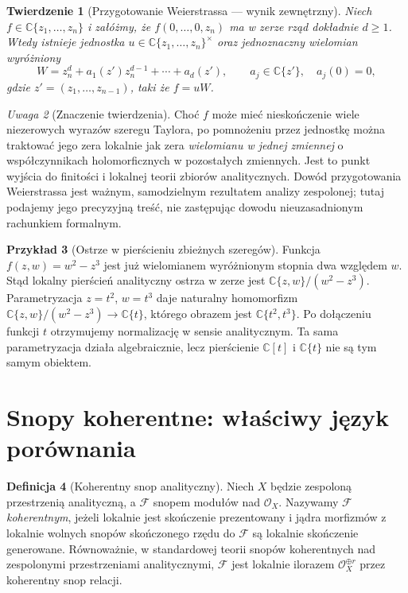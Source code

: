 \documentclass[11pt,a4paper,openany]{report}
\numberwithin{equation}{section}
\theoremstyle{plain}
\newtheorem{twierdzenie}{Twierdzenie}[section]
\theoremstyle{definition}
\newtheorem{definicja}[twierdzenie]{Definicja}
\newtheorem{przyklad}[twierdzenie]{Przykład}
\theoremstyle{remark}
\newtheorem{uwaga}[twierdzenie]{Uwaga}
\newcommand{\C}{\mathbb C}
\begin{document}
\begin{twierdzenie}[Przygotowanie Weierstrassa — wynik zewnętrzny]
\label{tw:ga9-weierstrass}
Niech $f\in\C\{z_1,\ldots,z_n\}$ i załóżmy, że
$f(0,\ldots,0,z_n)$ ma w zerze rząd dokładnie $d\ge1$.
Wtedy istnieje jednostka $u\in\C\{z_1,\ldots,z_n\}^\times$
oraz jednoznaczny wielomian wyróżniony
\[
 W=z_n^d+a_1(z')z_n^{d-1}+\cdots+a_d(z'),
 \qquad a_j\in\C\{z'\},\quad a_j(0)=0,
\]
gdzie $z'=(z_1,\ldots,z_{n-1})$, taki że $f=uW$.
\end{twierdzenie}

\begin{uwaga}[Znaczenie twierdzenia]
Choć $f$ może mieć nieskończenie wiele niezerowych wyrazów
szeregu Taylora, po pomnożeniu przez jednostkę można traktować
jego zera lokalnie jak zera \emph{wielomianu w jednej zmiennej}
o współczynnikach holomorficznych w pozostałych zmiennych.
Jest to punkt wyjścia do finitości i lokalnej teorii zbiorów
analitycznych. Dowód przygotowania Weierstrassa jest ważnym,
samodzielnym rezultatem analizy zespolonej; tutaj podajemy jego
precyzyjną treść, nie zastępując dowodu nieuzasadnionym
rachunkiem formalnym.
\end{uwaga}

\begin{przyklad}[Ostrze w pierścieniu zbieżnych szeregów]
Funkcja $f(z,w)=w^2-z^3$ jest już wielomianem wyróżnionym
stopnia dwa względem $w$. Stąd lokalny pierścień analityczny
ostrza w zerze jest $\C\{z,w\}/(w^2-z^3)$.
Parametryzacja $z=t^2$, $w=t^3$ daje naturalny homomorfizm
$\C\{z,w\}/(w^2-z^3)\to\C\{t\}$, którego obrazem jest
$\C\{t^2,t^3\}$. Po dołączeniu funkcji $t$ otrzymujemy
normalizację w sensie analitycznym. Ta sama parametryzacja
działa algebraicznie, lecz pierścienie $\C[t]$ i $\C\{t\}$
nie są tym samym obiektem.
\end{przyklad}

\section{Snopy koherentne: właściwy język porównania}
\label{sec:ga9-koherentne}

\begin{definicja}[Koherentny snop analityczny]
Niech $X$ będzie zespoloną przestrzenią analityczną,
a $\mathcal F$ snopem modułów nad $\mathcal O_X$.
Nazywamy $\mathcal F$ \emph{koherentnym}, jeżeli lokalnie
jest skończenie prezentowany i jądra morfizmów z lokalnie
wolnych snopów skończonego rzędu do $\mathcal F$ są lokalnie
skończenie generowane. Równoważnie, w standardowej teorii
snopów koherentnych nad zespolonymi przestrzeniami
analitycznymi, $\mathcal F$ jest lokalnie ilorazem
$\mathcal O_X^{\oplus r}$ przez koherentny snop relacji.
\end{definicja}
\end{document}
